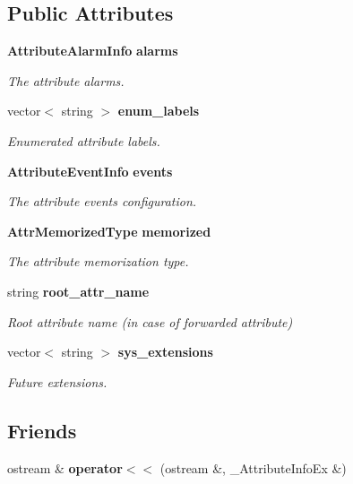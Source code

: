 \subsection*{Public Attributes}
\begin{DoxyCompactItemize}
\item 
{\bf Attribute\-Alarm\-Info} {\bf alarms}
\begin{DoxyCompactList}\small\item\em The attribute alarms. \end{DoxyCompactList}\item 
vector$<$ string $>$ {\bf enum\-\_\-labels}
\begin{DoxyCompactList}\small\item\em Enumerated attribute labels. \end{DoxyCompactList}\item 
{\bf Attribute\-Event\-Info} {\bf events}
\begin{DoxyCompactList}\small\item\em The attribute events configuration. \end{DoxyCompactList}\item 
{\bf Attr\-Memorized\-Type} {\bf memorized}
\begin{DoxyCompactList}\small\item\em The attribute memorization type. \end{DoxyCompactList}\item 
string {\bf root\-\_\-attr\-\_\-name}
\begin{DoxyCompactList}\small\item\em Root attribute name (in case of forwarded attribute) \end{DoxyCompactList}\item 
vector$<$ string $>$ {\bf sys\-\_\-extensions}
\begin{DoxyCompactList}\small\item\em Future extensions. \end{DoxyCompactList}\end{DoxyCompactItemize}
\subsection*{Friends}
\begin{DoxyCompactItemize}
\item 
ostream \& {\bf operator$<$$<$} (ostream \&, \-\_\-\-Attribute\-Info\-Ex \&)
\end{DoxyCompactItemize}


